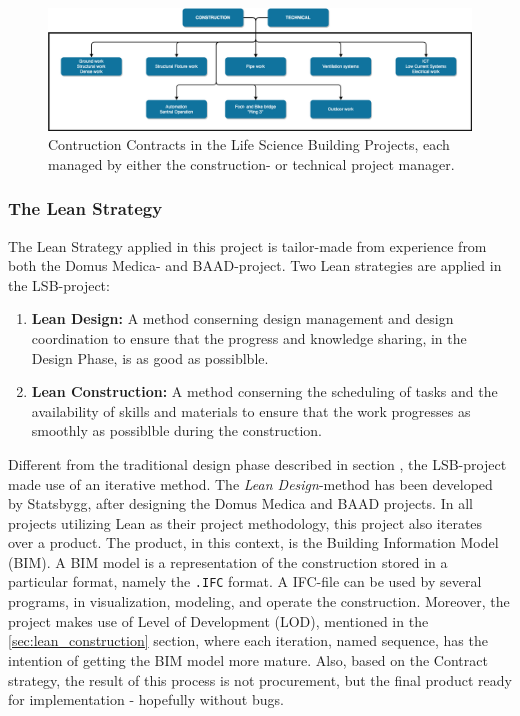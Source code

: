 \begin{figure}
    \centering
    \includegraphics[width=\textwidth]{fig/LVB_contracts.png}
    \caption{Contruction Contracts in the Life Science Building Projects, each managed by either the construction- or technical project manager.}
    \label{fig:project_contracts}
\end{figure}

\subsubsection*{The Lean Strategy}
The Lean Strategy applied in this project is tailor-made from experience from both the Domus Medica- and BAAD-project. Two Lean strategies are applied in the LSB-project: 

\begin{enumerate}
    \item \textbf{Lean Design:} A method conserning design management and design coordination to ensure that the progress and knowledge sharing, in the Design Phase, is as good as possiblble.
    \item \textbf{Lean Construction:} A method conserning the scheduling
    of tasks and the availability of skills and materials to ensure that the work progresses as smoothly as possiblble during the construction.
\end{enumerate}

Different from the traditional design phase described in section , the LSB-project made use of an iterative method. The \textit{Lean Design}-method has been developed by Statsbygg, after designing the Domus Medica and BAAD projects. In all projects utilizing Lean as their project methodology, this project also iterates over a product. The product, in this context, is the Building Information Model (BIM). A BIM model is a representation of the construction stored in a particular format, namely the \texttt{.IFC} format. A IFC-file can be used by several programs, in visualization, modeling, and operate the construction. Moreover, the project makes use of Level of Development (LOD), mentioned in the \ref{sec:lean_construction} section, where each iteration, named sequence, has the intention of getting the BIM model more mature. Also, based on the Contract strategy, the result of this process is not procurement, but the final product ready for implementation - hopefully without bugs. 

